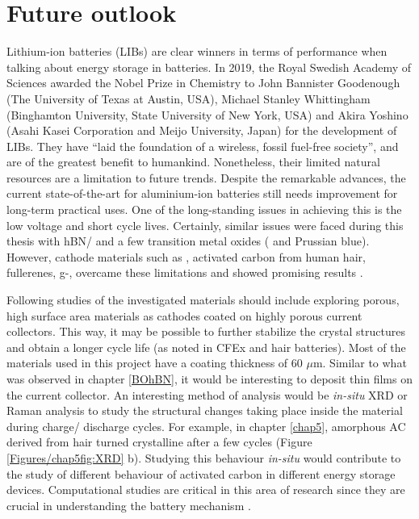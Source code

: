 \section{Future outlook}
Lithium-ion batteries (LIBs) are clear winners in terms of performance when talking about energy storage in batteries. In 2019, the Royal Swedish Academy of Sciences awarded the Nobel Prize in Chemistry to John Bannister Goodenough (The University of Texas at Austin, USA), Michael Stanley Whittingham (Binghamton University, State University of New York, USA) and Akira Yoshino (Asahi Kasei Corporation and Meijo University, Japan) for the development of LIBs. They have \enquote{laid the foundation of a wireless, fossil fuel-free society}, and are of the greatest benefit to humankind. Nonetheless, their limited natural resources are a limitation to future trends. 
Despite the remarkable advances, the current state-of-the-art for aluminium-ion batteries still needs improvement for long-term practical uses. One of the long-standing issues in achieving this is the low voltage and short cycle lives. Certainly, similar issues were faced during this thesis with hBN/ and a few transition metal oxides ( and Prussian blue). However, cathode materials such as , activated carbon from human hair, fullerenes, g-,  overcame these limitations and showed promising results \cite{divya_molybdenum_2019}. 

Following studies of the investigated materials should include exploring porous, high surface area materials as cathodes coated on highly porous current collectors. This way, it may be possible to further stabilize the crystal structures and obtain a longer cycle life (as noted in CFEx and hair batteries). Most of the materials used in this project have a coating thickness of 60 $\mu$m. Similar to what was observed in chapter \ref{BOhBN}, it would be interesting to deposit thin films on the current collector. An interesting method of analysis would be \textit{in-situ} XRD or Raman analysis to study the structural changes taking place inside the material during charge/ discharge cycles. For example, in chapter \ref{chap5}, amorphous AC derived from hair turned crystalline after a few cycles (Figure \ref{Figures/chap5fig:XRD} b). Studying this behaviour \textit{in-situ} would contribute to the study of different behaviour of activated carbon in different energy storage devices. Computational studies are critical in this area of research since they are crucial in understanding the battery mechanism \cite{bhauriyal_computational_2017, gao_understanding_2017, bhauriyal_staging_2017, agiorgousis_role_2017}. 

